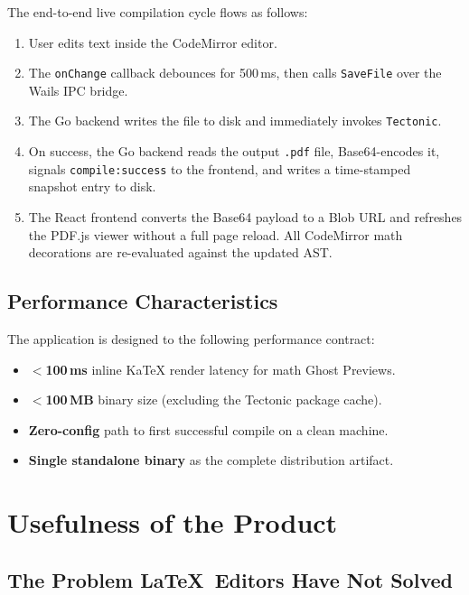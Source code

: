 \documentclass[11pt, a4paper]{article}
\begin{document}
The end-to-end live compilation cycle flows as follows:
\begin{enumerate}[noitemsep]
    \item User edits text inside the CodeMirror editor.
    \item The \texttt{onChange} callback debounces for 500\,ms, then calls \texttt{SaveFile} over the Wails IPC bridge.
    \item The Go backend writes the file to disk and immediately invokes \texttt{Tectonic}.
    \item On success, the Go backend reads the output \texttt{.pdf} file, Base64-encodes it, signals \texttt{compile:success} to the frontend, and writes a time-stamped snapshot entry to disk.
    \item The React frontend converts the Base64 payload to a Blob URL and refreshes the PDF.js viewer without a full page reload. All CodeMirror math decorations are re-evaluated against the updated AST.
\end{enumerate}

\subsection{Performance Characteristics}
The application is designed to the following performance contract:

\begin{itemize}[noitemsep]
    \item \textbf{$<$100\,ms} inline KaTeX render latency for math Ghost Previews.
    \item \textbf{$<$100\,MB} binary size (excluding the Tectonic package cache).
    \item \textbf{Zero-config} path to first successful compile on a clean machine.
    \item \textbf{Single standalone binary} as the complete distribution artifact.
\end{itemize}

\section{Usefulness of the Product}

\subsection{The Problem \LaTeX\ Editors Have Not Solved}
\end{document}

